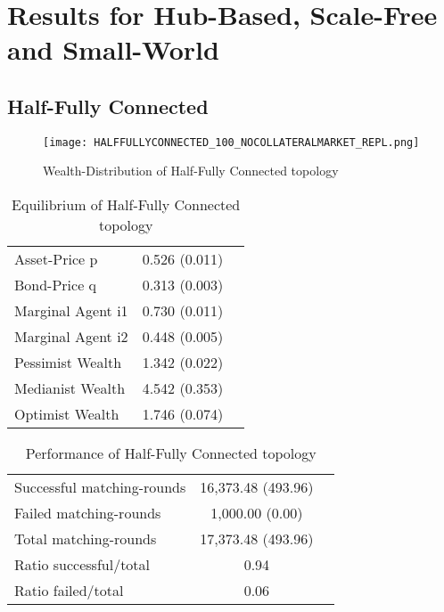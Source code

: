 \documentclass[Bachelorarbeit.tex]{subfiles}
\begin{document}
\graphicspath{{./figures/appendixResults/}}	%

\chapter{Results for Hub-Based, Scale-Free and Small-World}
\label{app:results}

\section{Half-Fully Connected}
\begin{figure}[H]
	\centering
  \texttt{[image: HALFFULLYCONNECTED\_100\_NOCOLLATERALMARKET\_REPL.png]}
	\caption{Wealth-Distribution of Half-Fully Connected topology }
	\label{fig:wealth_HALFFULLYCONNECTED_100_NOCOLLATERALMARKET_REPL}
\end{figure}

\begin{table}[H]
	\caption{Equilibrium of Half-Fully Connected topology}
	\centering
	\begin{tabular} { l c r }
		\hline
		Asset-Price p & 0.526 (0.011) \\
		Bond-Price q & 0.313 (0.003) \\
		Marginal Agent i1 & 0.730 (0.011) \\
		Marginal Agent i2 & 0.448 (0.005) \\
		\hline
		Pessimist Wealth & 1.342 (0.022) \\
		Medianist Wealth & 4.542 (0.353) \\
		Optimist Wealth & 1.746 (0.074) \\
		\hline
	\end{tabular}
\end{table} 

\begin{table}[H]
	\caption{Performance of Half-Fully Connected topology}
	\centering
	\begin{tabular} { l c r }
		\hline
		Successful matching-rounds & 16,373.48 (493.96) \\
		Failed matching-rounds & 1,000.00 (0.00) \\
		Total matching-rounds & 17,373.48 (493.96) \\
		\hline
		Ratio successful/total & 0.94 \\
		Ratio failed/total & 0.06 \\
		\hline
	\end{tabular}
\end{table}
\end{document}
